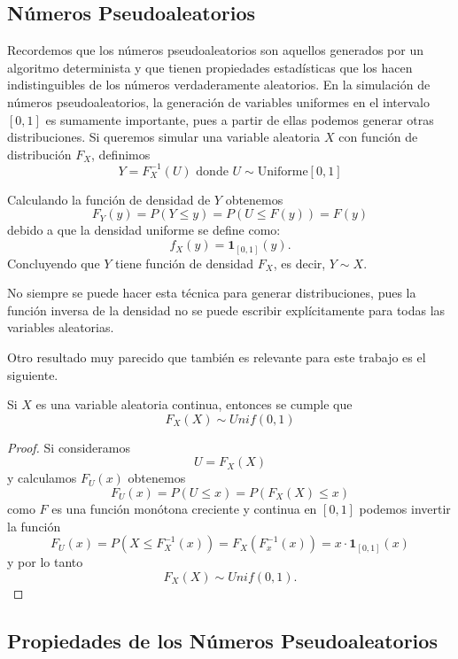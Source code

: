 \documentclass[../Main.tex]{subfiles}
\begin{document}
\subsection{Números Pseudoaleatorios}

Recordemos que los números pseudoaleatorios son aquellos generados por un algoritmo determinista y que tienen propiedades estadísticas que los hacen indistinguibles de los números verdaderamente aleatorios. En la simulación de números pseudoaleatorios, la generación de variables uniformes en el intervalo $[0,1]$ es sumamente importante, pues a partir de ellas podemos generar otras distribuciones. Si queremos simular una variable aleatoria $X$ con función de distribución $F_X$, definimos \[Y=F^{-1}_X(U)\text{  donde   }U\sim \mathrm{Uniforme}[0,1]\] 

Calculando la función de densidad de $Y$ obtenemos
\[F_Y(y)=P(Y\leq y)=P(U\leq F(y))=F(y)\] debido a que la densidad uniforme se define como:
\[f_X(y)=\mathbf{1}_{[0,1]}(y).\] 
Concluyendo que $Y$ tiene función de densidad $F_X$, es decir, $Y\sim X$.
\begin{remark}
    No siempre se puede hacer esta técnica para generar distribuciones, pues la función inversa de la densidad no se puede escribir explícitamente para todas las variables aleatorias.
\end{remark}
Otro resultado muy parecido que también es relevante para este trabajo es el siguiente. 
\begin{proposition}
\label{prop:inv}
    Si $X$ es una variable aleatoria continua, entonces se cumple que \[F_X(X)\sim Unif(0,1)\]
\end{proposition}
\begin{proof}
Si consideramos \[U=F_X(X)\] y calculamos $F_U(x)$ obtenemos
    \[F_U(x)=P(U\leq x) = P(F_X(X)\leq x) \]
    como $F$ es una función monótona creciente y continua en $[0,1]$ podemos invertir la función 
    \[F_U(x)= P(X\leq F^{-1}_X(x))=F_X(F^{-1}_x(x))=x \cdot \mathbf{1}_{[0,1]}(x)\] y por lo tanto  \[F_X(X)\sim Unif(0,1).\]
\end{proof}
\subsection{Propiedades de los Números Pseudoaleatorios}
\end{document}
